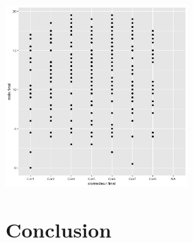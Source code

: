 \documentclass[]{report}
\begin{document}
	\begin{center}
	\includegraphics[width=70mm]{Figures/Notes/correcteur_final.jpg}
	\label{fig:scatter_correcteur_final}
\end{center}


\section{Conclusion}
\end{document}
